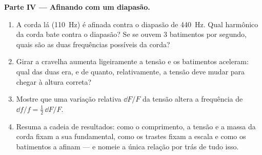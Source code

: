 \begin{problem}
\medskip
\noindent\textbf{Parte IV --- Afinando com um diapasão.}
\begin{enumerate}[resume]
  \item A corda lá (\qty{110}{Hz}) é afinada contra o diapasão de \qty{440}{Hz}.
        Qual harmônico da corda bate contra o diapasão? Se
        se ouvem \qty{3}{} batimentos por segundo, quais são as duas frequências
        possíveis da corda?
  \item Girar a cravelha aumenta ligeiramente a tensão e os batimentos
        aceleram: qual das duas era, e de quanto, relativamente,
        a tensão deve mudar para chegar à altura correta?
  \item Mostre que uma variação relativa $\dd F/F$ da tensão altera a
        frequência de $\dd f/f = \tfrac12\,\dd F/F$.
  \item Resuma a cadeia de resultados: como o comprimento, a tensão
        e a massa da corda fixam a sua fundamental, como os trastes fixam a escala e como
        os batimentos a afinam --- e nomeie a única relação por trás de tudo isso.
\end{enumerate}
\end{problem}
